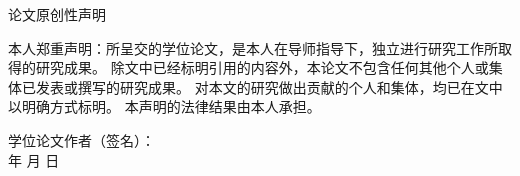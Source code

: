 \newpage
\vspace*{20pt}
\begin{center}{\heiti 论文原创性声明}\end{center}
\par\vspace*{30pt}
\renewcommand{\baselinestretch}{2}
{ \songti %



本人郑重声明：所呈交的学位论文，是本人在导师指导下，独立进行研究工作所取得的研究成果。
除文中已经标明引用的内容外，本论文不包含任何其他个人或集体已发表或撰写的研究成果。
对本文的研究做出贡献的个人和集体，均已在文中以明确方式标明。
本声明的法律结果由本人承担。

\vskip2cm

\hspace*{4cm}学位论文作者（签名）：\hspace{4cm} \hfill \\[1cm]
\hspace*{10cm}年 \hfill  月 \hfill 日\hspace{1cm}\hfill\par}

  \iflib
  \else
  \newpage
  \cleardoublepage
  \fi
\renewcommand{\baselinestretch}{1.6}
\small\normalsize
